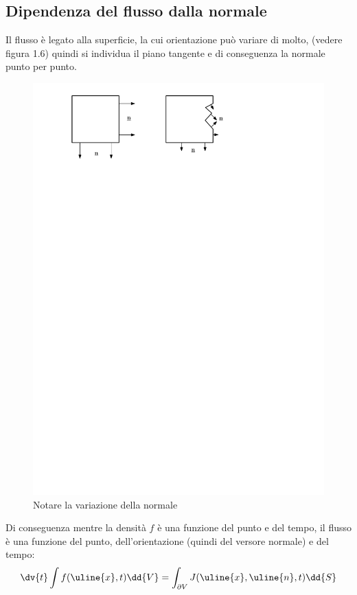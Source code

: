 \subsection{Dipendenza del flusso dalla normale}
Il flusso è legato alla superficie, la cui orientazione può variare di molto, (vedere figura 1.6) quindi si individua il piano tangente e di conseguenza la normale punto per punto.
%
	\begin{figure}[ht]
		\includegraphics[scale=0.75]{./1.4 Equazioni di bilancio/1.4-2}
		\centering
		\caption{Notare la variazione della normale}
	\end{figure}
%
Di conseguenza mentre la densità $f$ è una funzione del punto e del tempo, il flusso è una funzione del punto, dell'orientazione (quindi del versore normale) e del tempo:
%
	\begin{equation*}
		\dv{t} \int f (\uline{x}, t) \dd{V} = \int_{\partial{V}} J (\uline{x}, \uline{n}, t) \dd{S}
	\end{equation*}
